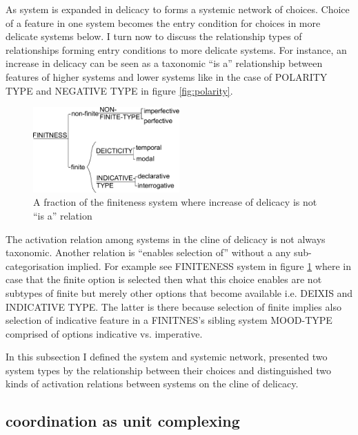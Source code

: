 As system is expanded in delicacy to forms a systemic network of choices. Choice of a feature in one system becomes the entry condition for choices in more delicate systems below. I turn now to discuss the relationship types of relationships forming entry conditions to more delicate systems. For instance, an increase in delicacy can be seen as a taxonomic ``is a'' relationship between features of higher systems and lower systems like in the case of POLARITY TYPE and NEGATIVE TYPE in figure \ref{fig:polarity}. 

\begin{figure}[hbtp]
	\centering
	\includegraphics[width=0.5\textwidth]{Figures/SFL-grammar/finitness-system.pdf}
	\caption{A fraction of the finiteness system where increase of delicacy is not ``is a'' relation}
	\label{fig:finitness-fraction}
\end{figure}

The activation relation among systems in the cline of delicacy is not always taxonomic. Another relation is ``enables selection of'' without a any sub-categorisation implied. For example see FINITENESS system in figure \ref{fig:finitness-fraction} where in case that the finite option is selected then what this choice enables are not subtypes of finite but merely other options that become available i.e. DEIXIS and INDICATIVE TYPE. The latter is there because selection of finite implies also selection of indicative feature in a FINITNES's sibling system MOOD-TYPE comprised of options indicative vs. imperative. 

In this subsection I defined the system and systemic network, presented two system types by the relationship between their choices and distinguished two kinds of activation relations between systems on the cline of delicacy.

\subsection{coordination as unit complexing}

